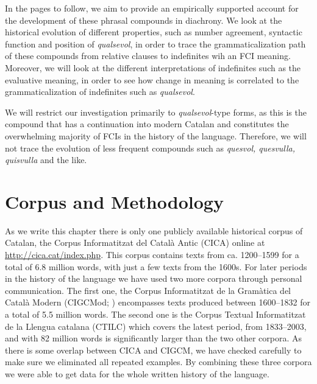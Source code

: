 \documentclass[output=paper,colorlinks,citecolor=brown]{langscibook}
\begin{document}
In the pages to follow, we aim to provide an empirically supported account for the development of these phrasal compounds in diachrony. We look at the historical evolution of different properties, such as number agreement, syntactic function and position of \textit{qualsevol}, in order to trace the grammaticalization path of these compounds from relative clauses to indefinites wih an FCI meaning. Moreover, we will look at the different interpretations of indefinites such as the evaluative meaning, in order to see how change in meaning is correlated to the grammaticalization of indefinites such as \textit{qualsevol}.

We will restrict our investigation primarily to \textit{qualsevol}-type forms, as this is the compound that has a continuation into modern Catalan and constitutes the overwhelming majority of FCIs in the history of the language. Therefore, we will not trace the evolution of less frequent compounds such as \textit{quesvol, quesvulla, quisvulla} and the like.


\section{Corpus and Methodology}\label{sec:kea4}\largerpage

As we write this chapter there is only one publicly available historical corpus of Catalan, the Corpus Informatitzat del Català Antic (CICA) online at \url{http://cica.cat/index.php}. This corpus contains texts from ca. 1200--1599 for a total of 6.8 million words, with just a few texts from the 1600s. For later periods in the history of the language we have used two more corpora through personal communication. The first one, the Corpus Informatitzat de la Gramàtica del Català Modern (CIGCMod; \cite{AntolíMartinez2018}) encompasses texts produced between 1600--1832 for a total of 5.5 million words. The second one is the Corpus Textual Informatitzat de la Llengua catalana (CTILC) which covers the latest period, from 1833--2003, and with 82 million words is significantly larger than the two other corpora. As there is some overlap between CICA and CIGCM, we have checked carefully to make sure we eliminated all repeated examples. By combining these three corpora we were able to get data for the whole written history of the language.
\end{document}
